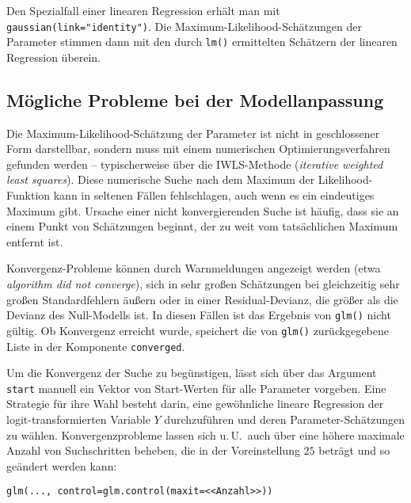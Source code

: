 Den Spezialfall einer linearen Regression erhält man mit \lstinline!gaussian(link="identity")!. Die Maximum-Likelihood-Schätzungen der Parameter stimmen dann mit den durch \lstinline!lm()! ermittelten Schätzern der linearen Regression überein.

\subsection{Mögliche Probleme bei der Modellanpassung}
\label{sec:glmConvergence}

Die Maximum-Likelihood-Schätzung der Parameter ist nicht in geschlossener Form darstellbar, sondern muss mit einem numerischen Optimierungsverfahren gefunden werden -- typischerweise über die IWLS-Methode (\emph{iterative weighted least squares}). Diese numerische Suche nach dem Maximum der Likelihood-Funktion kann in seltenen Fällen fehlschlagen, auch wenn es ein eindeutiges Maximum gibt. Ursache einer nicht konvergierenden Suche ist häufig, dass sie an einem Punkt von Schätzungen beginnt, der zu weit vom tatsächlichen Maximum entfernt ist.

Konvergenz-Probleme können durch Warnmeldungen angezeigt werden (etwa \emph{algorithm did not converge}), sich in sehr großen Schätzungen bei gleichzeitig sehr großen Standardfehlern äußern oder in einer Residual-Devianz, die größer als die Devianz des Null-Modells ist. In diesen Fällen ist das Ergebnis von \lstinline!glm()! nicht gültig. Ob Konvergenz erreicht wurde, speichert die von \lstinline!glm()! zurückgegebene Liste in der Komponente \lstinline!converged!.

Um die Konvergenz der Suche zu begünstigen, lässt sich über das Argument \lstinline!start! manuell ein Vektor von Start-Werten für alle Parameter vorgeben. Eine Strategie für ihre Wahl besteht darin, eine gewöhnliche lineare Regression der logit-transformierten Variable $Y$ durchzuführen und deren Parameter-Schätzungen zu wählen. Konvergenzprobleme lassen sich u.\,U.\ auch über eine höhere maximale Anzahl von Suchschritten beheben, die in der Voreinstellung $25$ beträgt und so geändert werden kann:
\begin{lstlisting}
glm(..., control=glm.control(maxit=<<Anzahl>>))
\end{lstlisting}

